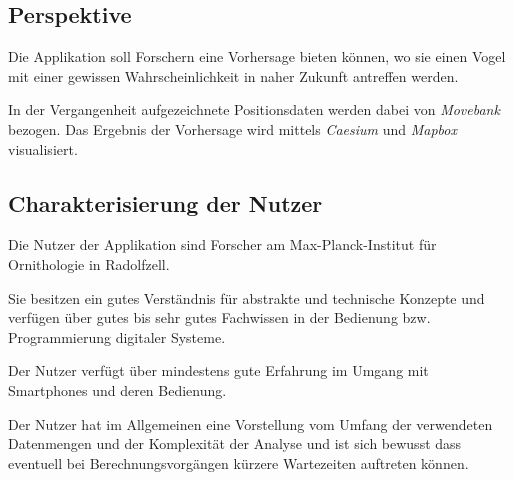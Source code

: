 \documentclass[12pt]{article} %
\begin{document}
\subsection{Perspektive}
Die Applikation soll Forschern eine Vorhersage bieten können, wo sie einen Vogel mit einer gewissen Wahrscheinlichkeit in naher Zukunft antreffen werden. 

In der Vergangenheit aufgezeichnete Positionsdaten werden dabei von \textit{Movebank} bezogen. Das Ergebnis der Vorhersage wird mittels \textit{Caesium} und \textit{Mapbox} visualisiert.






\subsection{Charakterisierung der Nutzer}

Die Nutzer der Applikation sind Forscher am Max-Planck-Institut für Ornithologie in Radolfzell.

Sie besitzen ein gutes Verständnis für abstrakte und technische Konzepte und verfügen über gutes bis sehr gutes Fachwissen in der Bedienung bzw. Programmierung digitaler Systeme.

Der Nutzer verfügt über mindestens gute Erfahrung im Umgang mit Smartphones und deren Bedienung.

Der Nutzer hat im Allgemeinen eine Vorstellung vom Umfang der verwendeten Datenmengen und der Komplexität der Analyse und ist sich bewusst dass eventuell bei Berechnungsvorgängen kürzere Wartezeiten auftreten können.
\end{document}
